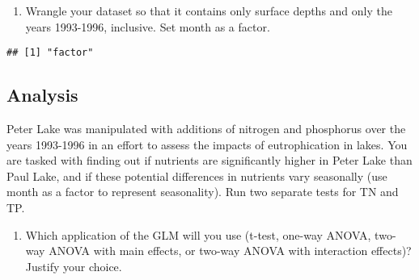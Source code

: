 \documentclass[]{article}
\newenvironment{Shaded}{\begin{snugshade}}{\end{snugshade}}
\newcommand{\DecValTok}[1]{\textcolor[rgb]{0.00,0.00,0.81}{#1}}
\newcommand{\KeywordTok}[1]{\textcolor[rgb]{0.13,0.29,0.53}{\textbf{#1}}}
\newcommand{\NormalTok}[1]{#1}
\newcommand{\OperatorTok}[1]{\textcolor[rgb]{0.81,0.36,0.00}{\textbf{#1}}}
\newcommand{\StringTok}[1]{\textcolor[rgb]{0.31,0.60,0.02}{#1}}
\providecommand{\tightlist}{%
  \setlength{\itemsep}{0pt}\setlength{\parskip}{0pt}}
\begin{document}
\begin{enumerate}
\def\labelenumi{\arabic{enumi}.}
\setcounter{enumi}{2}
\tightlist
\item
  Wrangle your dataset so that it contains only surface depths and only
  the years 1993-1996, inclusive. Set month as a factor.
\end{enumerate}

\begin{Shaded}
\end{Shaded}

\begin{verbatim}
## [1] "factor"
\end{verbatim}

\hypertarget{analysis}{%
\subsection{Analysis}\label{analysis}}

Peter Lake was manipulated with additions of nitrogen and phosphorus
over the years 1993-1996 in an effort to assess the impacts of
eutrophication in lakes. You are tasked with finding out if nutrients
are significantly higher in Peter Lake than Paul Lake, and if these
potential differences in nutrients vary seasonally (use month as a
factor to represent seasonality). Run two separate tests for TN and TP.

\begin{enumerate}
\def\labelenumi{\arabic{enumi}.}
\setcounter{enumi}{3}
\tightlist
\item
  Which application of the GLM will you use (t-test, one-way ANOVA,
  two-way ANOVA with main effects, or two-way ANOVA with interaction
  effects)? Justify your choice.
\end{enumerate}
\end{document}
